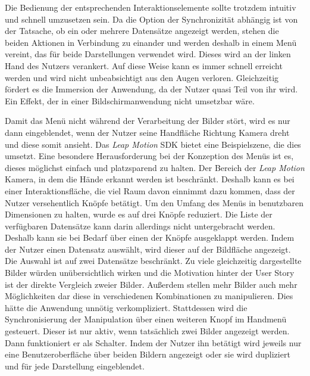 Die Bedienung der entsprechenden Interaktionselemente sollte trotzdem intuitiv und schnell umzusetzen sein. Da die Option der Synchronizität abhängig ist von der Tatsache, ob ein oder mehrere Datensätze angezeigt werden, stehen die beiden Aktionen in Verbindung zu einander und werden deshalb in einem Menü vereint, das für beide Darstellungen verwendet wird. Dieses wird an der linken Hand des Nutzers verankert. Auf diese Weise kann es immer schnell erreicht werden und wird nicht unbeabsichtigt aus den Augen verloren. Gleichzeitig fördert es die Immersion der Anwendung, da der Nutzer quasi Teil von ihr wird. Ein Effekt, der in einer Bildschirmanwendung nicht umsetzbar wäre. 

Damit das Menü nicht während der Verarbeitung der Bilder stört, wird es nur dann eingeblendet, wenn der Nutzer seine Handfläche Richtung Kamera dreht und diese somit ansieht. Das \textit{Leap Motion} SDK bietet eine Beispielszene, die dies umsetzt.
Eine besondere Herausforderung bei der Konzeption des Menüs ist es, dieses möglichst einfach und platzsparend zu halten. Der Bereich der \textit{Leap Motion} Kamera, in dem die Hände erkannt werden ist beschränkt. Deshalb kann es bei einer Interaktionsfläche, die viel Raum davon einnimmt dazu kommen, dass der Nutzer versehentlich Knöpfe betätigt. 
Um den Umfang des Menüs in benutzbaren Dimensionen zu halten, wurde es auf drei Knöpfe reduziert. 
Die Liste der verfügbaren Datensätze kann darin allerdings nicht untergebracht werden. Deshalb kann sie bei Bedarf über einen der Knöpfe ausgeklappt werden. 
Indem der Nutzer einen Datensatz auswählt, wird dieser auf der Bildfläche angezeigt. Die Auswahl ist auf zwei Datensätze beschränkt. Zu viele gleichzeitig dargestellte Bilder würden unübersichtlich wirken und die Motivation hinter der User Story ist der direkte Vergleich zweier Bilder. Außerdem stellen mehr Bilder auch mehr Möglichkeiten dar diese in verschiedenen Kombinationen zu manipulieren. Dies hätte die Anwendung unnötig verkompliziert. 
Stattdessen wird die Synchronisierung der Manipulation über einen weiteren Knopf im Handmenü gesteuert. Dieser ist nur aktiv, wenn tatsächlich zwei Bilder angezeigt werden. Dann funktioniert er als Schalter. Indem der Nutzer ihn betätigt wird jeweils nur eine Benutzeroberfläche über beiden Bildern angezeigt oder sie wird dupliziert und für jede Darstellung eingeblendet. 
 

